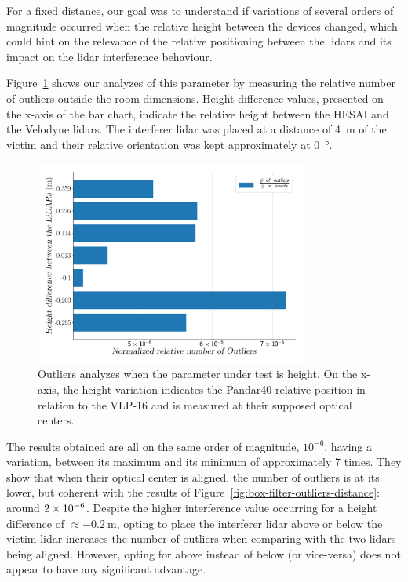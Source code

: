 For a fixed distance, our goal was to understand if variations of several orders of magnitude occurred when the relative height between the devices changed, which could hint on the relevance of the relative positioning between the \acp{lidar} and its impact on the \ac{lidar} interference behaviour.

Figure~\ref{fig:box-filter-outliers-height} shows our analyzes of this parameter by measuring the relative number of outliers outside the room dimensions. Height difference values, presented on the x-axis of the bar chart, indicate the relative height between the HESAI and the Velodyne \acp{lidar}. The interferer \ac{lidar} was placed at a distance of \SI{4}{\meter} of the victim and their relative orientation was kept approximately at \SI{0}{\degree}.

\begin{figure}[!ht]
\centering
\includegraphics[width=0.8\textwidth]{img/lidar-interference/box-filtering/interference-box-filter-outliers-height.png}
\caption[Relative number of outliers when the height between the \acsp{lidar} is varied on \acs{irislab}.]{Outliers analyzes when the parameter under test is height. On the x-axis, the height variation indicates the Pandar40 relative position in relation to the VLP-16 and is measured at their supposed optical centers.}
\label{fig:box-filter-outliers-height}
\end{figure}

The results obtained are all on the same order of magnitude, $10^{-6}$, having a variation, between its maximum and its minimum of approximately 7 times. They show that when their optical center is aligned, the number of outliers is at its lower, but coherent with the results of Figure~\ref{fig:box-filter-outliers-distance}: around $2\times 10^{-6}$. Despite the higher interference value occurring for a height difference of $\approx \SI{-0.2}{\meter}$, opting to place the interferer \ac{lidar} above or below the victim \ac{lidar} increases the number of outliers when comparing with the two \acp{lidar} being aligned. However, opting for above instead of below (or vice-versa) does not appear to have any significant advantage. 

